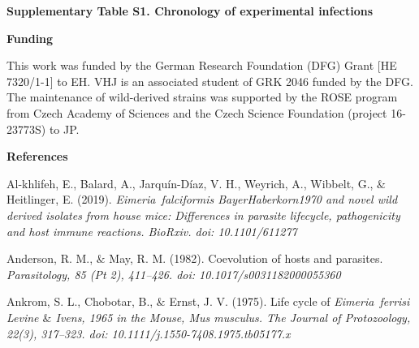 \documentclass[12pt]{article}
\renewcommand{\_}{\kern-1.5pt\textunderscore\kern-1.5pt}
\begin{document}

\textbf{Supplementary Table S1. Chronology of experimental \textcolor[HTML]{CE181E}{infections}}


\newpage
\par

\begin{FlushLeft}
{\fontsize{14pt}{16.8pt}\selectfont \textbf{Funding }\par}
\end{FlushLeft}\par

This work was funded by the German Research Foundation (DFG) Grant [HE 7320/1-1] to EH. VHJ is an associated student of GRK 2046 funded by the DFG. The maintenance of wild-derived strains was supported by the ROSE program from Czech Academy of Sciences and the Czech Science Foundation (project 16-23773S) to JP.\par

{\fontsize{14pt}{16.8pt}\selectfont \textbf{References}\par}\par

\begin{FlushLeft}
Al-khlifeh, E., Balard, A., Jarquín-Díaz, V. H., Weyrich, A., Wibbelt, G., $\&$  Heitlinger, E. (2019). \textit{Eimeria falciformis BayerHaberkorn1970 and novel wild derived isolates from house mice: Differences in parasite lifecycle, pathogenicity and host immune reactions. BioRxiv. doi: 10.1101/611277}
\end{FlushLeft}\par

\begin{FlushLeft}
Anderson, R. M., $\&$  May, R. M. (1982). Coevolution of hosts and parasites. \textit{Parasitology, 85 (Pt 2), 411–426. doi: 10.1017/s0031182000055360}
\end{FlushLeft}\par

\begin{FlushLeft}
Ankrom, S. L., Chobotar, B., $\&$  Ernst, J. V. (1975). Life cycle of \textit{Eimeria ferrisi Levine $\&$  Ivens, 1965 in the Mouse, Mus musculus. The Journal of Protozoology, 22(3), 317–323. doi: 10.1111/j.1550-7408.1975.tb05177.x}
\end{FlushLeft}\par
\end{document}
